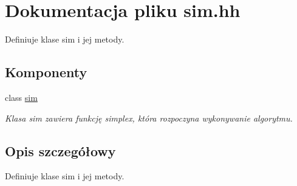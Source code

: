 \hypertarget{sim_8hh}{\section{\-Dokumentacja pliku sim.\-hh}
\label{sim_8hh}
}


\-Definiuje klase sim i jej metody.  


\subsection*{\-Komponenty}
\begin{DoxyCompactItemize}
\item 
class \hyperlink{classsim}{sim}
\begin{DoxyCompactList}\small\item\em \-Klasa sim zawiera funkcję simplex, która rozpoczyna wykonywanie algorytmu. \end{DoxyCompactList}\end{DoxyCompactItemize}


\subsection{\-Opis szczegółowy}
\-Definiuje klase sim i jej metody. 